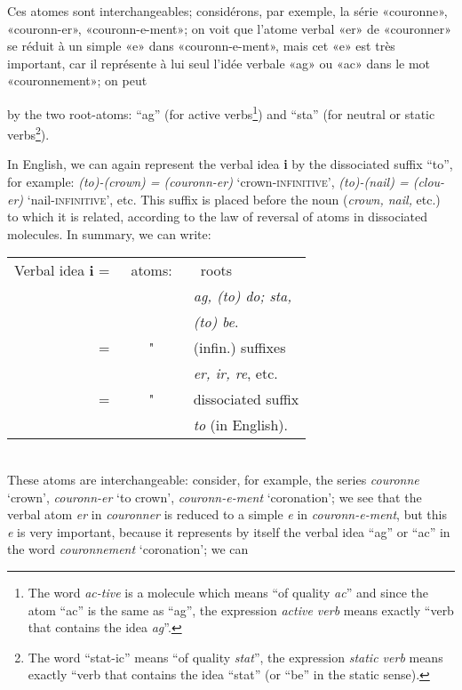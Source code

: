 \begin{sloppypar}
{  Ces atomes sont interchangeables; considérons, par exemple, la série
  «couronne», «couronn-er», «couronn-e-ment»; on voit que l'atome
  verbal «er» de «couronner» se réduit à un simple «e» dans
  «couronn-e-ment», mais cet «e» est très important, car il représente
  à lui seul l’idée verbale «ag» ou «ac» dans le mot «couronnement»;
  on peut }%
{\noindent by the two root-atoms: ``ag'' (for active
  verbs\footnote{The word \emph{ac-tive} is a molecule which means ``of
    quality \emph{ac}'' and since the atom ``ac'' is the same as
    ``ag'', the expression \emph{active verb} means exactly ``verb
    that contains the idea \emph{ag}''.}) and ``sta'' (for neutral or
  static verbs\footnote{The word ``stat-ic'' means ``of quality
    \emph{stat}'', the expression \emph{static verb} means exactly
    ``verb that contains the idea ``stat'' (or ``be'' in the static
    sense).}).

  In English, we can again represent the verbal idea \textbf{i} by the
  dissociated suffix ``to'', for example: \emph{(to)-(crown) =
    (couronn-er)} `crown-\textsc{infinitive}', \emph{(to)-(nail) =
    (clou-er)} `nail-\textsc{infinitive}', etc. This suffix is placed
  before the noun (\emph{crown, nail,} etc.) to which it is related,
  according to the law of reversal of atoms in dissociated
  molecules. In summary, we can write:\\[8pt]

  {\setlength{\tabcolsep}{0pt}
    \noindent
    \begin{tabular}[t]{rcl}
      Verbal idea  \textbf{i} = &\ atoms:\ &\ roots\\
                                &&\emph{ag,
                                   (to) do; sta, }\\
                                &&\emph{(to) be}.\\
      = &"& (infin.) suffixes\\
                                &&\emph{er, ir, re}, etc.\\
      =&"& dissociated suffix\\
                                &&\emph{to} (in English).\\
    \end{tabular}}\\[8pt]
                        
  These atoms are interchangeable: consider, for example, the series
  \emph{couronne} `crown', \emph{couronn-er} `to crown',
  \emph{couronn-e-ment} `coronation'; we see that the verbal atom
  \emph{er} in \emph{couronner} is reduced to a simple \emph{e} in
  \emph{couronn-e-ment}, but this \emph{e} is very important, because
  it represents by itself the verbal idea ``ag'' or ``ac'' in the word
  \emph{couronnement} `coronation'; we can}


\end{sloppypar}
